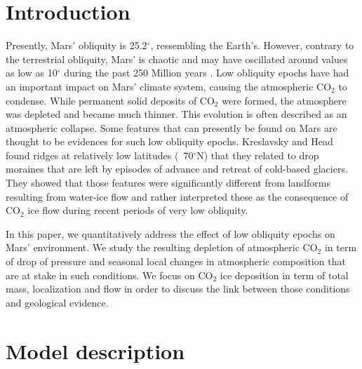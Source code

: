 \section{Introduction}
\label{sc:Intro}

Presently, Mars' obliquity is 25.2$^{\circ}$, ressembling the Earth's. However,
contrary to the terrestrial obliquity, Mars' is chaotic and may have oscillated around
values as low as 10$^{\circ}$ during the past 250 Million years \citep{Lask:04}.
Low obliquity epochs have had an important impact on Mars' climate system,
causing the atmospheric CO$_2$ to condense. While permanent solid deposits of CO$_2$
were formed, the atmosphere was depleted and became much thinner. This evolution is 
often described as an atmospheric collapse. Some features that can presently be found
on Mars are thought to be evidences for such low obliquity epochs. Kreslavsky and Head
\citep{Kres:11} found ridges at relatively low latitudes (~70$^{\circ}$N) that they related
to drop moraines that are left by episodes of advance and retreat of cold-based glaciers.
They showed that those features were significantly different from landforms resulting from
water-ice flow and rather interpreted these as the consequence of CO$_2$ ice flow
during recent periods of very low obliquity.

In this paper, we quantitatively address the effect of low obliquity epochs on Mars'
environment. We study the resulting depletion of atmospheric CO$_2$ in term of drop of
pressure and seasonal local changes in atmospheric composition that are at stake in such
conditions. We focus on CO$_2$ ice deposition in term of total mass, localization and flow
in order to discuss the link between those conditions and geological evidence.

\section{Model description}

